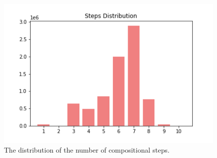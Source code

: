 \documentclass[10pt,twocolumn,letterpaper]{article}
\begin{document}
\begin{figure}[t]
\begin{center}
\includegraphics[width=0.8\linewidth]{Figures/steps_dist.png}
\end{center}
   \caption{The distribution of the number of compositional steps.}
\label{steps}
\end{figure}



\end{document}
